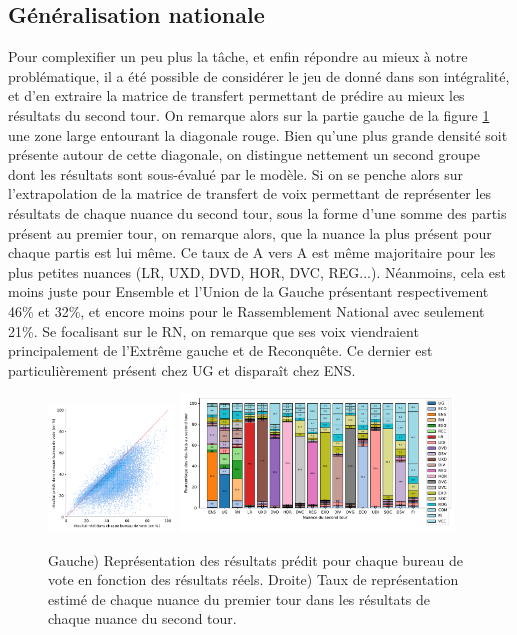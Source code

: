 \documentclass[11pt]{article}
\begin{document}
        \subsection*{Généralisation nationale}
            
            Pour complexifier un peu plus la tâche, et enfin répondre au mieux à notre problématique, il a été possible de considérer le jeu de donné dans son intégralité, et d'en extraire la matrice de transfert permettant de prédire au mieux les résultats du second tour. On remarque alors sur la partie gauche de la figure \ref{fig:True-Pred-Total} une zone large entourant la diagonale rouge. Bien qu'une plus grande densité soit présente autour de cette diagonale, on distingue nettement un second groupe dont les résultats sont sous-évalué par le modèle. Si on se penche alors sur l'extrapolation de la matrice de transfert de voix permettant de représenter les résultats de chaque nuance du second tour, sous la forme d'une somme des partis présent au premier tour, on remarque alors, que la nuance la plus présent pour chaque partis est lui même. Ce taux de A vers A est même majoritaire pour les plus petites nuances (LR, UXD, DVD, HOR, DVC, REG...). Néanmoins, cela est moins juste pour Ensemble et l'Union de la Gauche présentant respectivement 46\% et 32\%, et encore moins pour le Rassemblement National avec seulement 21\%. Se focalisant sur le RN, on remarque que ses voix viendraient principalement de l'Extrême gauche et de Reconquête. Ce dernier est particulièrement présent chez UG et disparaît chez ENS. 

            \begin{figure}[h]
                \begin{center}
                    \includegraphics[width=0.3\textwidth]{Total_True_Pred_Hist.pdf}
                    \includegraphics[width=0.65\textwidth]{Total-Matrice-Participation.pdf}
                    \caption{Gauche) Représentation des résultats prédit pour chaque bureau de vote en fonction des résultats réels. Droite) Taux de représentation estimé de chaque nuance du premier tour dans les résultats de chaque nuance du second tour.}
                    \label{fig:True-Pred-Total}
                \end{center}
            \end{figure}
        
\end{document}
